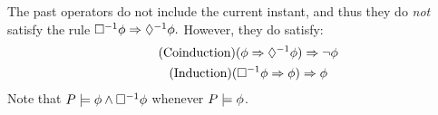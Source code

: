 The past operators do not include the current instant, and thus 
they do \emph{not} satisfy the rule
\begin{math}
  \Box^{-1}\phi\Rightarrow\Diamond^{-1}\phi.
\end{math}
However, they do satisfy:
\begin{gather*}
  \tag{Coinduction}
  (\phi \Rightarrow\Diamond^{-1}{\phi}) \Rightarrow\neg \phi
  \\
  \tag{Induction}
  (\Box^{-1}\phi \Rightarrow\phi) \Rightarrow\phi
\end{gather*}
Note that $P \models \phi \land \Box^{-1}\phi$ whenever $P \models \phi$.

